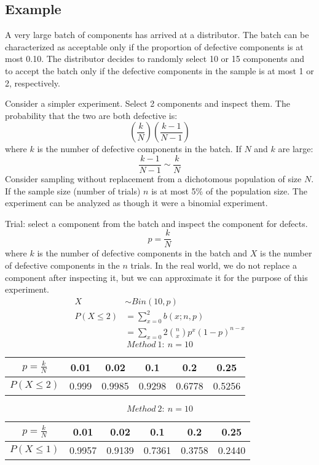 \documentclass[letterpaper, 12pt]{math}
\begin{document}
\subsection*{Example}
A very large batch of components has arrived at a distributor. The batch
can be characterized as acceptable only if the proportion of defective
components is at most 0.10. The distributor decides to randomly select 10 or
15 components and to accept the batch only if the defective components in the
sample is at most 1 or 2, respectively. \par
Consider a simpler experiment. Select 2 components and inspect them. The
probability that the two are both defective is:
\[ (\frac{k}{N})(\frac{k-1}{N-1}) \]
where \( k \) is the number of defective components in the batch. If \( N \)
and \( k \) are large:
\[ \frac{k-1}{N-1}\sim\frac{k}{N} \]
Consider sampling without replacement from a dichotomous population of size
\( N \). If the sample size (number of trials) \( n \) is at most 5\% of the
population size. The experiment can be analyzed as though it were a binomial
experiment. \par
Trial: select a component from the batch and inspect the component for defects.
\[ p = \frac{k}{N} \]
where \( k \) is the number of defective components in the batch and \( X \) is
the number of defective components in the \( n \) trials. In the real world,
we do not replace a component after inspecting it, but we can approximate it
for the purpose of this experiment.
\begin{align*}
  X &\sim Bin(10,p) \\
  P(X\leq 2) &= \sum_{x=0}^{2}b(x;n,p) \\
  &= \sum_{x=0}{2}\binom{n}{x}p^{x}(1-p)^{n-x}
\end{align*}
\[ Method\ 1:\ n = 10 \]
\begin{center}
  \begin{tabular}{|c|c|c|c|c|c|}
    \hline
    \( p = \frac{k}{N} \) & 0.01 & 0.02 & 0.1 & 0.2 & 0.25 \\
    \hline
    \( P(X\leq 2) \) & 0.999 & 0.9985 & 0.9298 & 0.6778 & 0.5256 \\
    \hline
  \end{tabular}
\end{center}
\[ Method\ 2:\ n = 10 \]
\begin{center}
  \begin{tabular}{|c|c|c|c|c|c|}
    \hline
    \( p = \frac{k}{N} \) & 0.01 & 0.02 & 0.1 & 0.2 & 0.25 \\
    \hline
    \( P(X\leq 1) \) & 0.9957 & 0.9139 & 0.7361 & 0.3758 & 0.2440 \\
    \hline
  \end{tabular}
\end{center}
\end{document}
